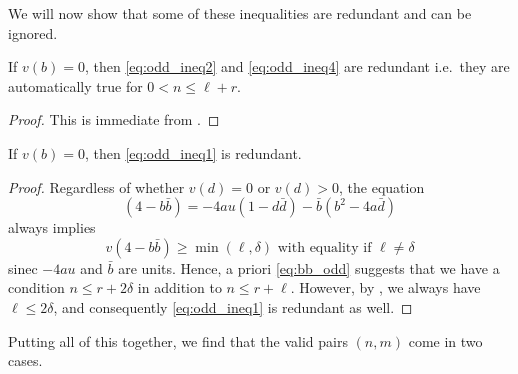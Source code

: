 We will now show that some of these inequalities are redundant and can be ignored.
\begin{lemma}
  If $v(b) = 0$, then \eqref{eq:odd_ineq2} and \eqref{eq:odd_ineq4} are redundant
  i.e.\ they are automatically true for $0 < n \le \ell + r$.
\end{lemma}
\begin{proof}
  This is immediate from .
\end{proof}

\begin{lemma}
  If $v(b) = 0$, then \eqref{eq:odd_ineq1} is redundant.
\end{lemma}
\begin{proof}
  Regardless of whether $v(d) = 0$ or $v(d) > 0$, the equation
  \[ (4-b \bar b) = -4au(1-d\bar d) - \bar b(b^2-4a\bar d) \]
  always implies
  \begin{equation}
    v(4-b\bar b) \ge \min(\ell,\delta) \text{ with equality if } \ell \neq \delta
    \label{eq:bb_odd}
  \end{equation}
  sinec $-4au$ and $\bar b$ are units.
  Hence, a priori \eqref{eq:bb_odd} suggests that we have a condition
  $n \le r + 2 \delta$ in addition to $n \le r + \ell$.
  However, by , we always have $\ell \le 2 \delta$,
  and consequently \eqref{eq:odd_ineq1} is redundant as well.
\end{proof}

Putting all of this together, we find that the valid pairs $(n,m)$ come in two cases.

